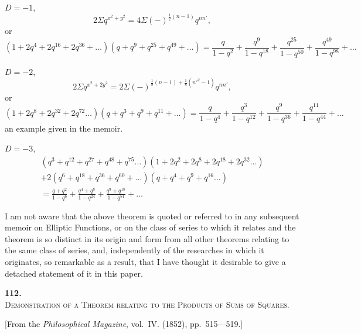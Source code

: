 \documentclass[11pt,a4paper]{book}
\begin{document}
$D = -1$,
\[
2\Sigma q^{x^2+y^2} = 4\Sigma(-)^{\frac{1}{2}(n-1)} q^{nn'},
\]
or
\[
(1 + 2q^4 + 2q^{16} + 2q^{36} + \ldots)(q + q^9 + q^{25} + q^{49} + \ldots)
= \frac{q}{1-q^2} + \frac{q^9}{1-q^{18}} + \frac{q^{25}}{1-q^{50}} + \frac{q^{49}}{1-q^{98}} + \ldots
\]

$D = -2$,
\[
2\Sigma q^{x^2+2y^2} = 2\Sigma(-)^{\frac{1}{8}(n-1)+\frac{1}{8}(n'^2-1)} q^{nn'},
\]
or
\[
(1 + 2q^8 + 2q^{32} + 2q^{72} \ldots)(q + q^3 + q^9 + q^{11} + \ldots)
= \frac{q}{1-q^4} + \frac{q^3}{1-q^{12}} + \frac{q^9}{1-q^{36}} + \frac{q^{11}}{1-q^{44}} + \ldots
\]
an example given in the memoir.

\newpage
\setcounter{page}{48}

$D = -3$,
\begin{multline*}
(q^3 + q^{12} + q^{27} + q^{48} + q^{75} \ldots)(1 + 2q^2 + 2q^8 + 2q^{18} + 2q^{32} \ldots)\\
+ 2(q^6 + q^{18} + q^{36} + q^{60} + \ldots)(q + q^4 + q^9 + q^{16} \ldots)\\
= \frac{q+q^2}{1-q^6} + \frac{q^4+q^8}{1-q^{24}} + \frac{q^9+q^{18}}{1-q^{54}} + \ldots
\end{multline*}

I am not aware that the above theorem is quoted or referred to in any subsequent memoir on Elliptic Functions, or on the class of series to which it relates and the theorem is so distinct in its origin and form from all other theorems relating to the same class of series, and, independently of the researches in which it originates, so remarkable as a result, that I have thought it desirable to give a detached statement of it in this paper.


\newpage
\setcounter{page}{49}

\begin{center}
{\Large\bfseries 112.}\\[0.5em]
{\large\scshape Demonstration of a Theorem relating to the Products of Sums of Squares.}
\end{center}
\vspace{0.3em}
\begin{center}
\small [From the \textit{Philosophical Magazine}, vol.~IV. (1852), pp.~515---519.]
\end{center}
\vspace{0.5em}
\end{document}
